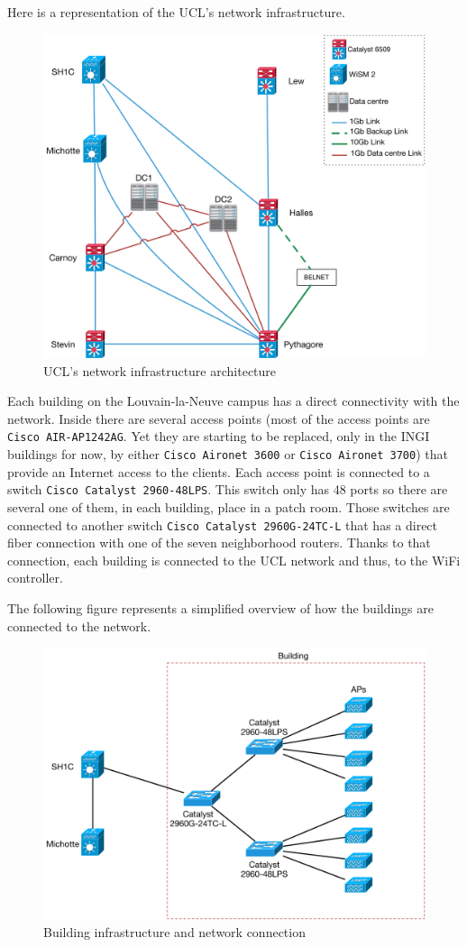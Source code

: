 Here is a representation of the UCL's network infrastructure.

\begin{figure}[H]
	\center
	\includegraphics[width=.9\linewidth]{Pictures/chapter2/ucl-infrastructure.png}
	\caption{UCL's network infrastructure architecture}
\end{figure}


Each building on the Louvain-la-Neuve campus has a direct connectivity with the network. Inside there are several access points (most of the access points are \texttt{Cisco AIR-AP1242AG}. Yet they are starting to be replaced, only in the INGI buildings for now, by either \texttt{Cisco Aironet 3600} or \texttt{Cisco Aironet 3700}) that provide an Internet access to the clients. Each access point is connected to a switch \texttt{Cisco Catalyst 2960-48LPS}. This switch only has 48 ports so there are several one of them, in each building, place in a patch room. Those switches are connected to another switch \texttt{Cisco Catalyst 2960G-24TC-L} that has a direct fiber connection with one of the seven neighborhood routers. Thanks to that connection, each building is connected to the UCL network and thus, to the WiFi controller.

The following figure represents a simplified overview of how the buildings are connected to the network.

\begin{figure}[H]
	\center
	\includegraphics[width=.8\linewidth]{Pictures/chapter2/building.png}
	\caption{Building infrastructure and network connection}
\end{figure}


